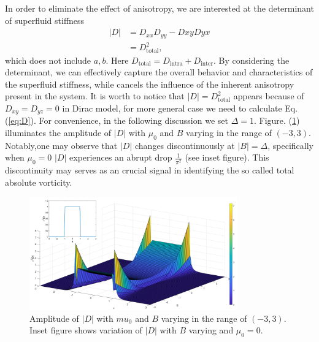\documentclass{article}
\begin{document}
In  order to eliminate the effect of anisotropy, we are interested at the determinant of superfluid stiffness 
\begin{align}
    \left\vert D \right\vert &= D_{xx}D_{yy} - D{xy}D{yx}\label{eq:D}\\
                             &= D_{\textrm{total}}^2, 
\end{align}
which does not include $ a,b $.  Here $ D_{\textrm{total}} = D_{\textrm{intra}} + D_{\textrm{inter}} $. By considering the determinant, we can effectively capture the overall behavior and characteristics of the superfluid stiffness, while cancels the influence of the inherent anisotropy present in the system. 
It is worth to notice that $ |D|=D_{\textrm{total}}^2  $ appears because of $ D_{xy}= D_{yz} = 0   $ in Dirac model, for more general case we need to calculate  Eq. (\ref{eq:D}). For convenience, in the following discussion we set $ \Delta = 1 $. Figure. (\ref{fig: Deter_D_3D}) illuminates the amplitude of $ |D| $ with $ \mu_0 $ and $ B $ varying in the range of $ \left(-3,3\right) $. Notably,one may observe that $ |D| $ changes discontinuously at $ |B| = \Delta $, specifically when $ \mu_0=0 $ $ |D| $ experiences an abrupt drop $ \frac{1}{\pi^2} $ (see inset figure). This discontinuity may serves as an crucial signal in identifying the so called total absolute vorticity. 

\begin{figure}[H]
    \centering
    \includegraphics[width=0.8\textwidth]{matlab code/D_deter_3D_hybrid.pdf}
    \caption{Amplitude of $ |D| $ with $ mu_0 $ and $ B $ varying in the range of $ \left(-3,3\right) $. Inset figure shows variation of $ |D| $ with $ B $ varying and $ \mu_0 =0 $. }
    \label{fig: Deter_D_3D}
\end{figure}
\end{document}
